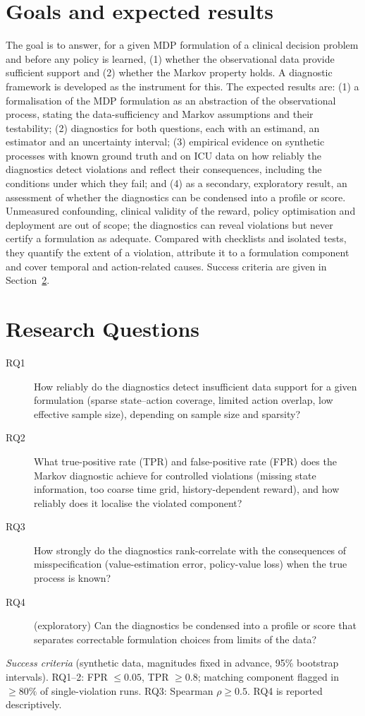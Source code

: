 \documentclass[runningheads]{llncs}
\begin{document}
\section{Goals and expected results}
The goal is to answer, for a given MDP formulation of a clinical decision problem and before any policy is learned, (1) whether the observational data provide sufficient support and (2) whether the Markov property holds. A diagnostic framework is developed as the instrument for this. The expected results are: (1) a formalisation of the MDP formulation as an abstraction of the observational process, stating the data-sufficiency and Markov assumptions and their testability; (2) diagnostics for both questions, each with an estimand, an estimator and an uncertainty interval; (3) empirical evidence on synthetic processes with known ground truth and on ICU data on how reliably the diagnostics detect violations and reflect their consequences, including the conditions under which they fail; and (4) as a secondary, exploratory result, an assessment of whether the diagnostics can be condensed into a profile or score. \\
Unmeasured confounding, clinical validity of the reward, policy optimisation and deployment are out of scope; the diagnostics can reveal violations but never certify a formulation as adequate. Compared with checklists and isolated tests, they quantify the extent of a violation, attribute it to a formulation component and cover temporal and action-related causes. Success criteria are given in Section~\ref{sec:rq}.

\section{Research Questions}
\label{sec:rq}
\begin{description}
  \item[RQ1] How reliably do the diagnostics detect insufficient data support for a given formulation (sparse state--action coverage, limited action overlap, low effective sample size), depending on sample size and sparsity?
  \item[RQ2] What true-positive rate (TPR) and false-positive rate (FPR) does the Markov diagnostic achieve for controlled violations (missing state information, too coarse time grid, history-dependent reward), and how reliably does it localise the violated component?
  \item[RQ3] How strongly do the diagnostics rank-correlate with the consequences of misspecification (value-estimation error, policy-value loss) when the true process is known?
  \item[RQ4] (exploratory) Can the diagnostics be condensed into a profile or score that separates correctable formulation choices from limits of the data?
\end{description}
\emph{Success criteria} (synthetic data, magnitudes fixed in advance, 95\% bootstrap intervals). RQ1--2: FPR $\le 0.05$, TPR $\ge 0.8$; matching component flagged in $\ge 80\%$ of single-violation runs. RQ3: Spearman $\rho \ge 0.5$. RQ4 is reported descriptively.
\end{document}
